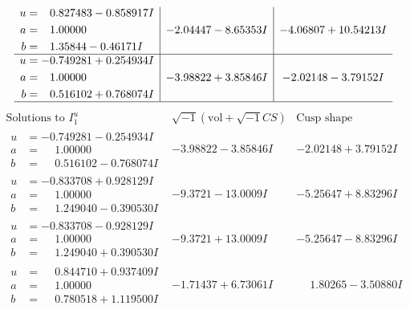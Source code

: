 \documentclass[1p]{elsarticle_modified}
\theoremstyle{definition}
\newcommand{\I}{\sqrt{-1}}
\begin{document}
$$\begin{array}{c|c|c}
\begin{aligned}
u &= \phantom{-}0.827483 - 0.858917 I \\
a &= \phantom{-}1.00000\phantom{ +0.000000I} \\
b &= \phantom{-}1.35844 - 0.46171 I\end{aligned}
 & -2.04447 - 8.65353 I & -4.06807 + 10.54213 I \\ \hline\begin{aligned}
u &= -0.749281 + 0.254934 I \\
a &= \phantom{-}1.00000\phantom{ +0.000000I} \\
b &= \phantom{-}0.516102 + 0.768074 I\end{aligned}
 & -3.98822 + 3.85846 I & -2.02148 - 3.79152 I\\
 \hline 
 \end{array}$$\newpage$$\begin{array}{c|c|c}  
\text{Solutions to }I^u_{1}& \I (\text{vol} + \sqrt{-1}CS) & \text{Cusp shape}\\
 \hline 
\begin{aligned}
u &= -0.749281 - 0.254934 I \\
a &= \phantom{-}1.00000\phantom{ +0.000000I} \\
b &= \phantom{-}0.516102 - 0.768074 I\end{aligned}
 & -3.98822 - 3.85846 I & -2.02148 + 3.79152 I \\ \hline\begin{aligned}
u &= -0.833708 + 0.928129 I \\
a &= \phantom{-}1.00000\phantom{ +0.000000I} \\
b &= \phantom{-}1.249040 - 0.390530 I\end{aligned}
 & -9.3721 - 13.0009 I & -5.25647 + 8.83296 I \\ \hline\begin{aligned}
u &= -0.833708 - 0.928129 I \\
a &= \phantom{-}1.00000\phantom{ +0.000000I} \\
b &= \phantom{-}1.249040 + 0.390530 I\end{aligned}
 & -9.3721 + 13.0009 I & -5.25647 - 8.83296 I \\ \hline\begin{aligned}
u &= \phantom{-}0.844710 + 0.937409 I \\
a &= \phantom{-}1.00000\phantom{ +0.000000I} \\
b &= \phantom{-}0.780518 + 1.119500 I\end{aligned}
 & -1.71437 + 6.73061 I & \phantom{-}1.80265 - 3.50880 I \\ \hline\begin{aligned}

\end{aligned}
\end{array}$$
\end{document}
